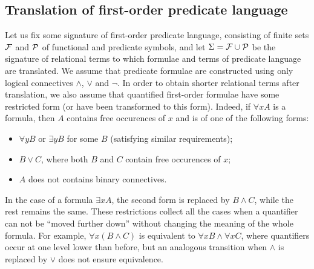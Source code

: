 \subsection{Translation of first-order predicate language}

Let us fix some signature of first-order predicate language, consisting of
finite sets $\cal F$ and $\cal P$ of functional and predicate symbols, and
let \(\Sigma =\cal F\cup P\) be the  signature of relational terms to
which formulae and terms of predicate language are translated.  We assume
that predicate formulae are constructed using only logical connectives
$\land$, $\lor$ and $\neg$.  In order to obtain shorter relational terms after
translation, we also assume that quantified first-order formulae
have some restricted form (or have been transformed to this form).  Indeed,
if \(\forall x A\) is a formula, then $A$ contains free occurences of $x$ and
is of one of the following forms:
\begin{itemize}
\item \(\forall y B\) or \(\exists y B\) for some $B$ (satisfying similar
requirements);
\item \(B\lor C\), where both $B$ and $C$ contain free occurences of $x$;
\item $A$ does not contains binary connectives.
\end{itemize}
In the case of a formula \(\exists x A\), the second form is replaced by
\(B\land C\), while the rest remains the same.  These restrictions collect
all the cases when a quantifier can not be ``moved further down'' without
changing the meaning of the whole formula.  For example, \(\forall x(B\land
C)\) is equivalent to \(\forall x B\land \forall x C\), where quantifiers
occur at one level lower than before, but an analogous transition when
$\land$ is replaced by $\lor$ does not ensure equivalence. 

